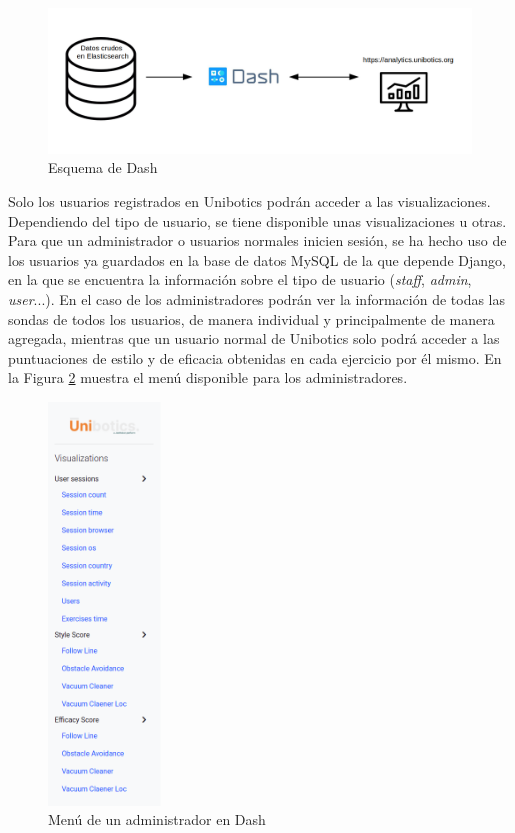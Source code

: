 \begin{figure}[H]
    \centering
    \includegraphics[width=17cm, keepaspectratio]{img/esquemadash.png}
    \caption{Esquema de Dash}
    \label{fig:menu}
\end{figure}


Solo los usuarios registrados en Unibotics podrán acceder a las visualizaciones. Dependiendo del tipo de usuario, se tiene disponible unas visualizaciones u otras. Para que un administrador o usuarios normales inicien sesión, se ha hecho uso de los usuarios ya guardados en la base de datos MySQL de la que depende Django, en la que se encuentra la información sobre el tipo de usuario (\textit{staff}, \textit{admin}, \textit{user}...). En el caso de los administradores podrán ver la información de todas las sondas de todos los usuarios, de manera individual y principalmente de manera agregada, mientras que un usuario normal de Unibotics solo podrá acceder a las puntuaciones de estilo y de eficacia obtenidas en cada ejercicio por él mismo. En la Figura \ref{fig:menu} muestra el menú disponible para los administradores.

\begin{figure}[H]
    \centering
    \includegraphics[width=3cm, keepaspectratio]{img/menu.png}
    \caption{Menú de un administrador en Dash}
    \label{fig:menu}
\end{figure}


